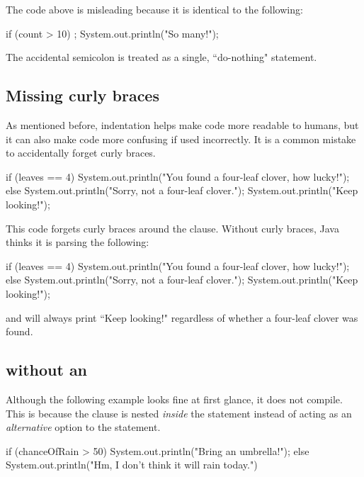 \noindent The code above is misleading because it is identical to the following:
\begin{code}
if (count > 10) 
{
    ;
}
System.out.println("So many!");
\end{code}

\noindent The accidental semicolon is treated as a single, ``do-nothing" statement.

\subsection{Missing curly braces}
As mentioned before, indentation helps make code more readable to humans, but it can also make code more confusing if used incorrectly. It is a common mistake to accidentally forget curly braces.

\begin{code}
if (leaves == 4) 
{
    System.out.println("You found a four-leaf clover, how lucky!");
} 
else
    System.out.println("Sorry, not a four-leaf clover.");
    System.out.println("Keep looking!");
\end{code}

\noindent This code forgets curly braces around the  clause. Without curly braces, Java thinks it is parsing the following:

\begin{code}
if (leaves == 4) 
{
    System.out.println("You found a four-leaf clover, how lucky!");
} 
else
{
    System.out.println("Sorry, not a four-leaf clover.");
}
System.out.println("Keep looking!");
\end{code}

and will always print ``Keep looking!" regardless of whether a four-leaf clover was found. 

\subsection{ without an }

Although the following example looks fine at first glance, it does not compile. This is because the  clause is nested \emph{inside} the  statement instead of acting as an \emph{alternative} option to the  statement.

\begin{code}
if (chanceOfRain > 50) 
{
    System.out.println("Bring an umbrella!");
    else 
    {
        System.out.println("Hm, I don't think it will rain today.")
    }
}
\end{code}

